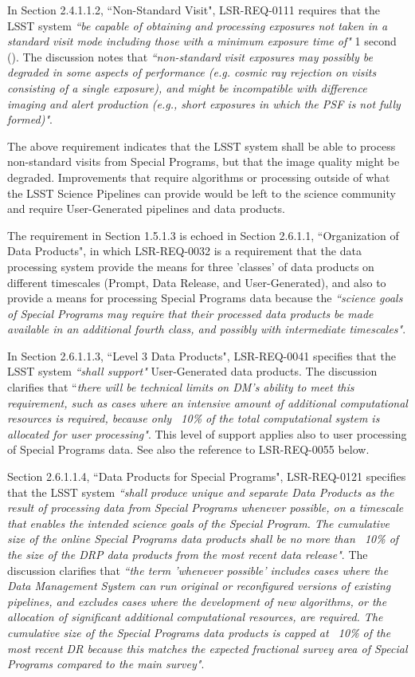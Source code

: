 In Section 2.4.1.1.2, ``Non-Standard Visit", LSR-REQ-0111 requires that the LSST system {\it ``be capable of obtaining and processing exposures not taken in a standard visit mode including those with a minimum exposure time of"} 1 second ().
The discussion notes that {\it ``non-standard visit exposures may possibly be degraded in some aspects of performance (e.g. cosmic ray rejection on visits consisting of a single exposure), and might be incompatible with difference imaging and alert production (e.g., short exposures in which the PSF is
not fully formed)"}.

The above requirement indicates that the LSST system shall be able to process non-standard visits from Special Programs, but that the image quality might be degraded.
Improvements that require algorithms or processing outside of what the LSST Science Pipelines can provide would be left to the science community and require User-Generated pipelines and data products.

The requirement in Section 1.5.1.3 is echoed in Section 2.6.1.1, ``Organization of Data Products", in which LSR-REQ-0032 is a requirement that the data processing system provide the means for three 'classes' of data products on different timescales (Prompt, Data Release, and User-Generated), and also to provide a means for processing Special Programs data because the {\it ``science goals of Special Programs may require that their processed data products be made available in an additional fourth class, and possibly with intermediate timescales"}.

In Section 2.6.1.1.3, ``Level 3 Data Products", LSR-REQ-0041 specifies that the LSST system {\it ``shall support"} User-Generated data products.
The discussion clarifies that ``{\it there will be technical limits on DM's ability to meet this requirement, such as cases where an intensive amount of additional computational resources is required, because only ~10\% of the total computational system is allocated for user processing"}.
This level of support applies also to user processing of Special Programs data.
See also the reference to LSR-REQ-0055 below.

Section 2.6.1.1.4, ``Data Products for Special Programs", LSR-REQ-0121 specifies that the LSST system {\it ``shall produce unique and separate Data Products as the result of processing data from Special Programs whenever possible, on a timescale that enables the intended science goals of the Special Program.
The cumulative size of the online Special Programs data products shall be no more than ~10\% of the size of the DRP data products from the most recent data
release"}.
The discussion clarifies that {\it ``the term 'whenever possible' includes cases where the Data Management System can run original or reconfigured versions of existing pipelines, and excludes cases where the development of new algorithms, or the allocation of significant additional computational resources, are required.
The cumulative size of the Special Programs data products is capped at ~10\% of the most recent DR because this matches the expected fractional survey area of Special Programs compared to the main survey"}.

